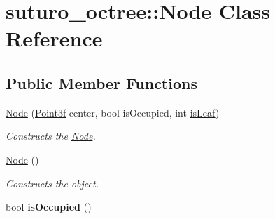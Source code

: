 \hypertarget{classsuturo__octree_1_1Node}{\section{suturo\-\_\-octree\-:\-:Node Class Reference}
\label{classsuturo__octree_1_1Node}
}
\subsection*{Public Member Functions}
\begin{DoxyCompactItemize}
\item 
\hyperlink{classsuturo__octree_1_1Node_ad950cd5ccb6fe1c8276407594543e780}{Node} (\hyperlink{structPoint3f}{Point3f} center, bool is\-Occupied, int \hyperlink{classsuturo__octree_1_1Node_af165133c7b374ce9d7204f7fb1c61921}{is\-Leaf})
\begin{DoxyCompactList}\small\item\em Constructs the \hyperlink{classsuturo__octree_1_1Node}{Node}. \end{DoxyCompactList}\item 
\hypertarget{classsuturo__octree_1_1Node_aa4a574ba768c3e6132f500230d3b4e23}{\hyperlink{classsuturo__octree_1_1Node_aa4a574ba768c3e6132f500230d3b4e23}{Node} ()}\label{classsuturo__octree_1_1Node_aa4a574ba768c3e6132f500230d3b4e23}

\begin{DoxyCompactList}\small\item\em Constructs the object. \end{DoxyCompactList}\item 
\hypertarget{classsuturo__octree_1_1Node_a8a189b19875b114835a817a005a06f46}{bool {\bfseries is\-Occupied} ()}\label{classsuturo__octree_1_1Node_a8a189b19875b114835a817a005a06f46}


\end{DoxyCompactItemize}
